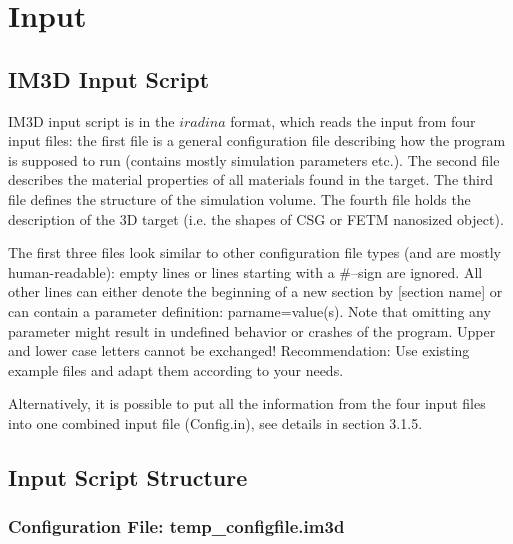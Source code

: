 
\chapter{Input}  %

\label{Chapter3}  %



\section{IM3D Input Script}

IM3D input script is in the $iradina$ format, which reads the input from four input files: the first file is a general configuration file describing how the program is supposed to run (contains mostly simulation parameters etc.). The second file describes the material properties of all materials found in the target. The third file defines the structure of the simulation volume. The fourth file holds the description of the 3D target (i.e. the shapes of CSG or FETM nanosized object).

The first three files look similar to other configuration file types (and are mostly human-readable): empty lines or lines starting with a \#–sign are ignored. All other lines can either denote the beginning of a new section by [section name] or can contain a parameter definition: parname=value(s). Note that omitting any parameter might result in undefined behavior or crashes of the program. Upper and lower case letters cannot be exchanged! Recommendation: Use existing example files and adapt them according to your needs.

Alternatively, it is possible to put all the information from the four input files into one combined input file (Config.in), see details in section 3.1.5.


\section{Input Script Structure}

\subsection{Configuration File: temp\_configfile.im3d}

